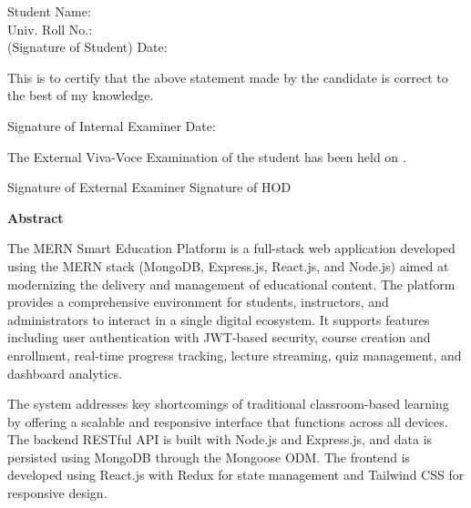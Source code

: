 \documentclass[12pt, a4paper, oneside]{report}
\begin{document}
\vfill %

\noindent Student Name:\quad \underline{\hspace{6cm}}\\[6pt]
\noindent Univ. Roll No.:\quad \underline{\hspace{6cm}}\\[6pt]
\noindent (Signature of Student) \hfill Date: \underline{\hspace{3cm}}

\vfill %

\noindent This is to certify that the above statement made by the candidate is correct to the best of my knowledge.

\vfill %

\noindent Signature of Internal Examiner \hfill Date: \underline{\hspace{3cm}}

\vfill %

\noindent The External Viva-Voce Examination of the student has been held on \underline{\hspace{3cm}}.

\vfill %

\noindent Signature of External Examiner \hfill Signature of HOD
\newpage
{}
\begin{center}
{\fontsize{16}{19}\selectfont\bfseries Abstract}
\end{center}

\vspace{0.5cm}

The MERN Smart Education Platform is a full-stack web application developed using the MERN stack (MongoDB, Express.js, React.js, and Node.js) aimed at modernizing the delivery and management of educational content. The platform provides a comprehensive environment for students, instructors, and administrators to interact in a single digital ecosystem. It supports features including user authentication with JWT-based security, course creation and enrollment, real-time progress tracking, lecture streaming, quiz management, and dashboard analytics.

The system addresses key shortcomings of traditional classroom-based learning by offering a scalable and responsive interface that functions across all devices. The backend RESTful API is built with Node.js and Express.js, and data is persisted using MongoDB through the Mongoose ODM. The frontend is developed using React.js with Redux for state management and Tailwind CSS for responsive design.
\end{document}
